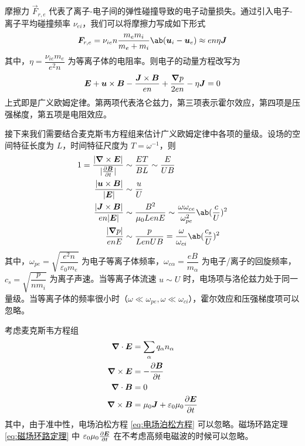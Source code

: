 摩擦力 $\vec{F}_{r,e}$ 代表了离子-电子间的弹性碰撞导致的电子动量损失。通过引入电子-离子平均碰撞频率 $\nu_{ei}$，我们可以将摩擦力写成如下形式
\begin{equation}
\vec{F}_{r,e} = \nu_{ie} n \frac{m_e m_i}{m_e + m_i}
\ab( \vec{u}_i - \vec{u}_e )
\approx e n \eta \vec{J}
\end{equation}
其中，$\eta = \dfrac{\nu_{ie} m_e}{e^2 n}$ 为等离子体的电阻率。则电子的动量方程改写为
\begin{equation}
\bm{E} + \bm{u} \times \bm{B} - \frac{\bm{J} \times \bm{B}}{e n} + \frac{\bm{\nabla}{p}}{2 e n} - \eta \bm{J} = 0
\end{equation}
上式即是广义欧姆定律。第两项代表洛仑兹力，第三项表示霍尔效应，第四项是压强梯度，第五项是电阻效应。

接下来我们需要结合麦克斯韦方程组来估计广义欧姆定律中各项的量级。设场的空间特征长度为 $L$，时间特征尺度为 $T = \omega^{-1}$，则
\begin{subequations}\begin{align}
1 = \frac{|\curl{\vec{E}}|}{|\pdv{\vec{B}}{t}|} &\sim \frac{E T}{B L} \sim \frac{E}{U B} \\
\frac{|\vec{u} \times \vec{B}|}{|\vec{E}|} &\sim \frac{u}{U} \\
\frac{|\vec{J} \times \vec{B}|}{e n |\vec{E}|} &\sim \frac{B^2}{\mu_0 L e n E} \sim \frac{\omega \omega_{ce}}{\omega_{pe}^2} \ab(\frac{c}{U})^2 \\
\frac{|\grad{p}|}{e n E} &\sim \frac{p}{L e n U B} = \frac{\omega}{\omega_{ci}} \ab(\frac{c_s}{U})^2
\end{align}\end{subequations}
其中，$\omega_{pe} = \sqrt{\dfrac{e^2 n}{\varepsilon_0 m_e}}$ 为电子等离子体频率，$\omega_{c\alpha} = \dfrac{e B}{m_\alpha}$ 为电子/离子的回旋频率，$c_s = \sqrt{\dfrac{p}{n m_i}}$ 为离子声速。当等离子体流速 $u \sim U$ 时，电场项与洛伦兹力处于同一量级。当等离子体的频率很小时（$\omega \ll \omega_{pe}, \omega \ll \omega_{ci}$），霍尔效应和压强梯度项可以忽略。

考虑麦克斯韦方程组
\begin{subequations}\begin{align}
\bm{\nabla} \cdot{\bm{E}} &= \sum_\alpha q_\alpha n_\alpha \label{eq:电场泊松方程}\\
\bm{\nabla} \times{\bm{E}} &= - \pdv{\bm{B}}{t} \\
\bm{\nabla} \cdot{\bm{B}} &= 0 \\
\bm{\nabla} \times{\bm{B}} &= \mu_0 \bm{J} + \varepsilon_0 \mu_0 \pdv{\bm{E}}{t} \label{eq:磁场环路定理}
\end{align}\end{subequations}
其中，由于准中性，电场泊松方程 \ref{eq:电场泊松方程} 可以忽略。磁场环路定理 \ref{eq:磁场环路定理} 中 $\varepsilon_0 \mu_0 \pdv{\bm{E}}{t}$ 在不考虑高频电磁波的时候可以忽略。

